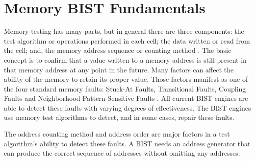 \chapter{Memory BIST Fundamentals}
\label{chap:background}
Memory testing has many parts, but in general there are three components: the test algorithm or operations performed in each cell; the data written or read from the cell; and, the memory address sequence or counting method \cite{5993815}.  The basic concept is to confirm that a value written to a memory address is still present in that memory address at any point in the future.  Many factors can affect the ability of the memory to retain its proper value.  Those factors manifest as one of the four standard memory faults: Stuck-At Faults, Transitional Faults, Coupling Faults and Neighborhood Pattern-Sensitive Faults \cite{VanDeGoor1991}. All current BIST engines are able to detect these faults with varying degrees of effectiveness.  The BIST engines use memory test algorithms to detect, and in some cases, repair these faults.    

The address counting method and address order are major factors in a test algorithm's ability to detect these faults.   A BIST needs an address generator that can produce the correct sequence of addresses without omitting any addresses.  







